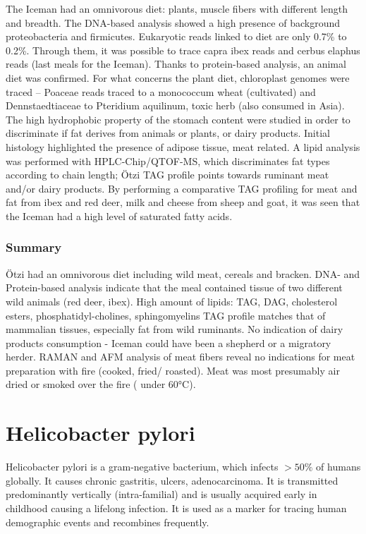 	The Iceman had an omnivorous diet: plants, muscle fibers with different length and breadth.
	The DNA-based analysis showed a high presence of background proteobacteria and firmicutes.
	Eukaryotic reads linked to diet are only 0.7\% to 0.2\%.
	Through them, it was possible to trace capra ibex reads and cerbus elaphus reads (last meals for the Iceman).
	Thanks to protein-based analysis, an animal diet was confirmed.
	For what concerns the plant diet, chloroplast genomes were traced – Poaceae reads traced to a monococcum wheat (cultivated) and Dennstaedtiaceae to Pteridium aquilinum, toxic herb (also consumed in Asia).
	The high hydrophobic property of the stomach content were studied in order to discriminate if fat derives from animals or plants, or dairy products.
	Initial histology highlighted the presence of adipose tissue, meat related.
	A lipid analysis was performed with HPLC-Chip/QTOF-MS, which discriminates fat types according to chain length; Ötzi TAG profile points towards ruminant meat and/or dairy products.
	By performing a comparative TAG profiling for meat and fat from ibex and red deer, milk and cheese from sheep and goat, it was seen that the Iceman had a high level of saturated fatty acids.

		\subsubsection{Summary}
		Ötzi had an omnivorous diet including wild meat, cereals and bracken.
		DNA- and Protein-based analysis indicate that the meal contained tissue of two different wild animals (red deer, ibex).
		High amount of lipids: TAG, DAG, cholesterol esters, phosphatidyl-cholines, sphingomyelins TAG profile matches that of mammalian tissues, especially fat from wild ruminants.
		No indication of dairy products consumption - Iceman could have been a shepherd or a migratory herder.
		RAMAN and AFM analysis of meat fibers reveal no indications for meat preparation with fire (cooked, fried/ roasted).
		Meat was most presumably air dried or smoked over the fire ( under 60°C).

\section{Helicobacter pylori}
Helicobacter pylori is a gram-negative bacterium, which infects $>50\%$ of humans globally.
It causes chronic gastritis, ulcers, adenocarcinoma.
It is transmitted predominantly vertically (intra-familial) and is usually acquired early in childhood causing a lifelong infection.
It is used as a marker for tracing human demographic events and recombines frequently.

